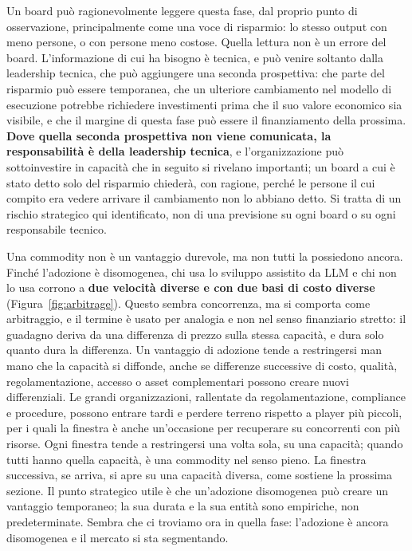 \documentclass[10pt,oneside,openany]{book}
\begin{document}
Un board può ragionevolmente leggere questa fase, dal proprio punto di osservazione, principalmente come una voce di risparmio: lo stesso output con meno persone, o con persone meno costose. Quella lettura non è un errore del board. L'informazione di cui ha bisogno è tecnica, e può venire soltanto dalla leadership tecnica, che può aggiungere una seconda prospettiva: che parte del risparmio può essere temporanea, che un ulteriore cambiamento nel modello di esecuzione potrebbe richiedere investimenti prima che il suo valore economico sia visibile, e che il margine di questa fase può essere il finanziamento della prossima. \textbf{Dove quella seconda prospettiva non viene comunicata, la responsabilità è della leadership tecnica}, e l'organizzazione può sottoinvestire in capacità che in seguito si rivelano importanti; un board a cui è stato detto solo del risparmio chiederà, con ragione, perché le persone il cui compito era vedere arrivare il cambiamento non lo abbiano detto. Si tratta di un rischio strategico qui identificato, non di una previsione su ogni board o su ogni responsabile tecnico.

\begin{notebox}
Una commodity non è un vantaggio durevole, ma non tutti la possiedono ancora. Finché l'adozione è disomogenea, chi usa lo sviluppo assistito da LLM e chi non lo usa corrono a \textbf{due velocità diverse e con due basi di costo diverse} (Figura~\ref{fig:arbitrage}). Questo sembra concorrenza, ma si comporta come arbitraggio, e il termine è usato per analogia e non nel senso finanziario stretto: il guadagno deriva da una differenza di prezzo sulla stessa capacità, e dura solo quanto dura la differenza. Un vantaggio di adozione tende a restringersi man mano che la capacità si diffonde, anche se differenze successive di costo, qualità, regolamentazione, accesso o asset complementari possono creare nuovi differenziali. Le grandi organizzazioni, rallentate da regolamentazione, compliance e procedure, possono entrare tardi e perdere terreno rispetto a player più piccoli, per i quali la finestra è anche un'occasione per recuperare su concorrenti con più risorse. Ogni finestra tende a restringersi una volta sola, su una capacità; quando tutti hanno quella capacità, è una commodity nel senso pieno. La finestra successiva, se arriva, si apre su una capacità diversa, come sostiene la prossima sezione. Il punto strategico utile è che un'adozione disomogenea può creare un vantaggio temporaneo; la sua durata e la sua entità sono empiriche, non predeterminate. Sembra che ci troviamo ora in quella fase: l'adozione è ancora disomogenea e il mercato si sta segmentando.
\end{notebox}
\end{document}
